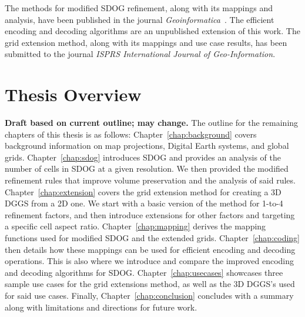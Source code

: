 The methods for modified SDOG refinement, along with its mappings and analysis, have been published in the journal \textit{Geoinformatica}~\cite{ulmertoward2020}.
The efficient encoding and decoding algorithms are an unpublished extension of this work.
The grid extension method, along with its mappings and use case results, has been submitted to the journal \textit{ISPRS International Journal of Geo-Information}.


\section{Thesis Overview}
\textbf{Draft based on current outline; may change.}
The outline for the remaining chapters of this thesis is as follows:
Chapter~\ref{chap:background} covers background information on map projections, Digital Earth systems, and global grids. 
Chapter~\ref{chap:sdog} introduces SDOG and provides an analysis of the number of cells in SDOG at a given resolution.
We then provided the modified refinement rules that improve volume preservation and the analysis of said rules.
Chapter~\ref{chap:extension} covers the grid extension method for creating a 3D DGGS from a 2D one.
We start with a basic version of the method for 1-to-4 refinement factors, and then introduce extensions for other factors and targeting a specific cell aspect ratio.
Chapter~\ref{chap:mapping} derives the mapping functions used for modified SDOG and the extended grids.
Chapter~\ref{chap:coding} then details how these mappings can be used for efficient encoding and decoding operations.
This is also where we introduce and compare the improved encoding and decoding algorithms for SDOG.
Chapter~\ref{chap:usecases} showcases three sample use cases for the grid extensions method, as well as the 3D DGGS's used for said use cases.
Finally, Chapter~\ref{chap:conclusion} concludes with a summary along with limitations and directions for future work.
